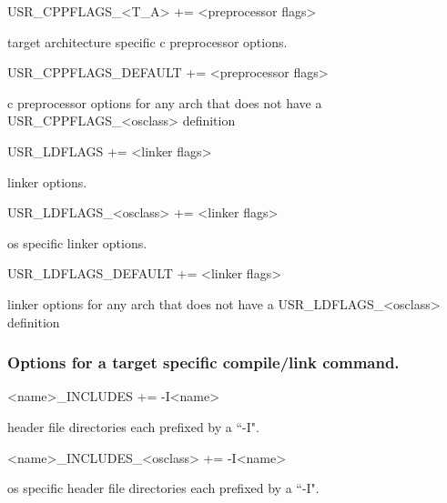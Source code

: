 \begin{description}\item USR\_CPPFLAGS\_\textless{}T\_A\textgreater{} += \textless{}preprocessor flags\textgreater{}

\end{description}target architecture specific c preprocessor options.

\begin{description}\item USR\_CPPFLAGS\_DEFAULT += \textless{}preprocessor flags\textgreater{}

\end{description}c preprocessor options for any arch that does not have a USR\_CPPFLAGS\_\textless{}osclass\textgreater{} definition

\begin{description}\item {}USR\_LDFLAGS += \textless{}linker flags\textgreater{}

\end{description}linker options.

\begin{description}\item USR\_LDFLAGS\_\textless{}osclass\textgreater{} += \textless{}linker flags\textgreater{}

\end{description}os specific linker options.

\begin{description}\item USR\_LDFLAGS\_DEFAULT += \textless{}linker flags\textgreater{}

\end{description}linker options for any arch that does not have a USR\_LDFLAGS\_\textless{}osclass\textgreater{} definition

\subsubsection{Options for a target specific compile/link command.}

\begin{description}\item \textless{}name\textgreater{}\_INCLUDES += -I\textless{}name\textgreater{}

\end{description}header file directories each prefixed by a ``-I".

\begin{description}\item \textless{}name\textgreater{}\_INCLUDES\_\textless{}osclass\textgreater{} += -I\textless{}name\textgreater{}

\end{description}os specific header file directories each prefixed by a ``-I".

